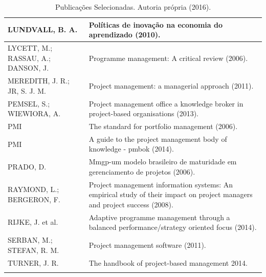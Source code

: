 \begin{longtable}{| p{} | p{} |}
    LUNDVALL, B. A. &
    Políticas de inovação na economia do aprendizado (2010). \\ \hline
    LYCETT, M.; RASSAU, A.; DANSON, J. &
    Programme management: A critical review (2006). \\ \hline
    MEREDITH, J. R.; JR, S. J. M. &
    Project management: a managerial approach (2011). \\ \hline
    PEMSEL, S.; WIEWIORA, A. &
    Project management office a knowledge broker in project-based organisations (2013). \\ \hline
    PMI &
    The standard for portfolio management (2006). \\ \hline
    PMI &
    A guide to the project management body of knowledge - pmbok (2014). \\ \hline
    PRADO, D. &
    Mmgp-um modelo brasileiro de maturidade em gerenciamento de projetos (2006). \\ \hline
    RAYMOND, L.; BERGERON, F. &
    Project management information systems: An empirical study of their impact on project managers and project success (2008). \\ \hline
    RIJKE, J. et al. &
    Adaptive programme management through a balanced performance/strategy oriented focus (2014). \\ \hline
    SERBAN, M.; STEFAN, R. M. &
    Project management software (2011). \\ \hline
    TURNER, J. R. &
    The handbook of project-based management 2014. \\ \hline
  \caption{Publicações Selecionadas. Autoria própria (2016).}
  \label{tabela_autores}
\end{longtable}
